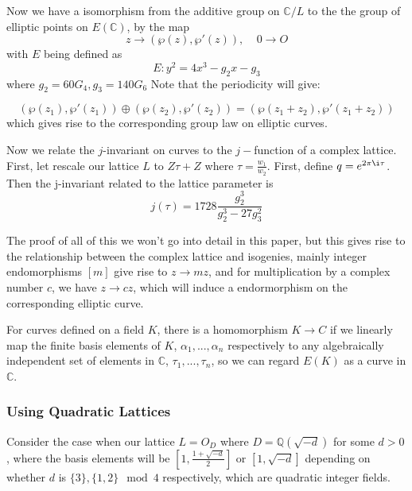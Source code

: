 \documentclass[12pt,twoside]{article}
\begin{document}
Now we have a isomorphism from the additive group on $\mathbb{C}/L$ to the the group of elliptic points on $E(\mathbb{C})$, by the map $$z \rightarrow ( \wp(z), \wp' (z)), \> \> \> \> \> 0 \rightarrow O $$ with $E$ being defined as 
\begin{equation} 
E: y^{2} = 4x^{3} - g_{2}x - g_{3} 
\end{equation} 
where $g_{2} = 60G_{4}, g_{3} = 140G_{6}$  
Note that the periodicity will give: 

\begin{equation} 
(\wp(z_{1}), \wp'(z_{1})) \oplus (\wp(z_{2}), \wp'(z_{2})) = (\wp(z_{1} + z_{2}), \wp'(z_{1} + z_{2})) 
\end{equation} which gives rise to the corresponding group law on elliptic curves. 

Now we relate the $j$-invariant on curves to the $j-$function of a complex lattice. First, let rescale our lattice $L$ to $Z\tau + Z$ where $\tau = \frac{w_{1}}{w_{2}}$. First, define $q = e^{2\pi \i \tau}$. Then the j-invariant related to the lattice parameter is 
\begin{equation}
j(\tau) = 1728 \frac{g_{2}^{3}}{g_{2}^{3} - 27 g_{3}^{2}} 
\end{equation} 
 
 
The proof of all of this we won't go into detail in this paper, but this gives rise to the relationship between the complex lattice and isogenies, mainly integer endomorphisms $[m]$ give rise to $ z \rightarrow mz$, and for multiplication by a complex number $c$, we have $z \rightarrow cz$, which will induce a endormorphism on the corresponding elliptic curve.   


For curves defined on a field $K$, there is a homomorphism $K \rightarrow C$ if we linearly map the finite basis elements of $K$, $\alpha_{1}, ...,\alpha_{n}$ respectively to any algebraically independent set of elements in $\mathbb{C}$, $\tau_{1},..., \tau_{n}$, so we can regard $E(K)$ as a curve in $\mathbb{C}$.  

\subsubsection{Using Quadratic Lattices }
Consider the case when our lattice $L = O_{D}$ where $D = \mathbb{Q}(\sqrt{-d})$ for some $d > 0$, where the basis elements will be $[1, \frac{1+\sqrt{-d}}{2}] $ or $[1, \sqrt{-d}]$ depending on whether $d$ is $\{3\}, \{1,2\} \mod 4$ respectively, which are quadratic integer fields. 
\end{document}

